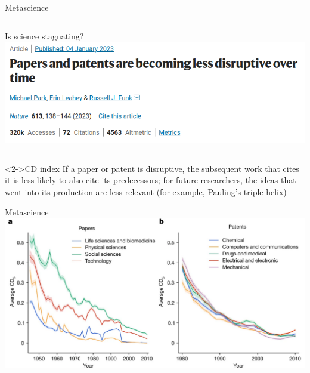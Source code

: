 \documentclass{beamer}
\begin{document}
\begin{frame}{Metascience}

	\begin{columns}
		Is science stagnating?
		\includegraphics[width=1\textwidth]{../images/stagnant.png}
	\end{columns}
	
	\begin{block}<2->{CD index}
		If a paper or patent is disruptive, the subsequent work that cites it is less likely to also cite its predecessors; for future researchers, the ideas that went into its production are less relevant (for example, Pauling's triple helix)
	\end{block}

	
\end{frame}

\begin{frame}{Metascience}
	\includegraphics[width=1\textwidth]{../images/paperspatents.png}
\end{frame}

\end{document}
